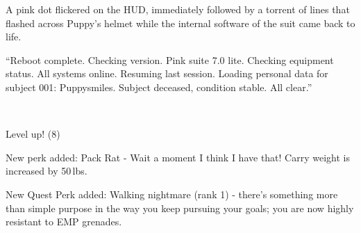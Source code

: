 
A pink dot flickered on the HUD, immediately followed by a torrent of lines that flashed across Puppy's helmet while the internal software of the suit came back to life.

{\mt ``Reboot complete. Checking version. Pink suite 7.0 lite. Checking equipment status. All systems online. Resuming last session. Loading personal data for subject 001: Puppysmiles. Subject deceased, condition stable. All clear.''}


~\vfill

\begin{engnote}
		Level up! (8)
	
		New perk added: Pack Rat - Wait a moment I think I have that! Carry weight is increased by 50\,lbs.
	
		New Quest Perk added: Walking nightmare (rank 1) - there's something more than simple purpose in the way you keep pursuing your goals; you are now highly resistant to EMP grenades.
\end{engnote}

